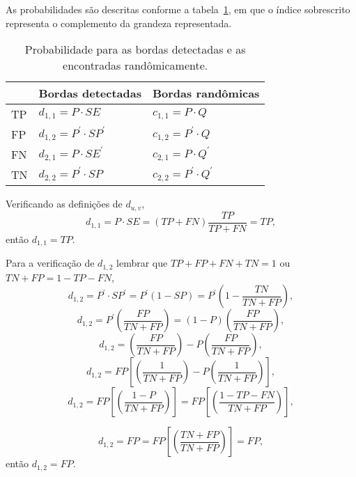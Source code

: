 As probabilidades são descritas  conforme a tabela~\ref{cap_fusao_tab04},
em que o índice sobrescrito representa o complemento da grandeza representada.
 
\begin{table}[hbt]
	\centering
	\caption{Probabilidade para as bordas detectadas e as encontradas randômicamente.}\label{cap_fusao_tab04}
\begin{tabular}{@{}lll@{}} \toprule
	     & Bordas detectadas  & Bordas randômicas  \\ \midrule
	TP  & $d_{1,1}=P    \cdot SE$     & $c_{1,1}=P    \cdot Q$  \\ 
	FP  & $d_{1,2}=P^{'}\cdot SP^{'}$ & $c_{1,2}=P^{'}\cdot Q$  \\ 
	FN  & $d_{2,1}=P    \cdot SE^{'}$ & $c_{2,1}=P    \cdot Q^{'}$  \\ 
	TN  & $d_{2,2}=P^{'}\cdot SP$     & $c_{2,2}=P^{'}\cdot Q^{'}$  \\ \bottomrule 
\end{tabular}
\end{table}


Verificando as definições de $d_{u,v}$,
\begin{equation}\label{cap_fusao_44}
	d_{1,1}=P\cdot SE = (TP + FN)\frac{TP}{TP + FN}=TP,
\end{equation}
então $d_{1,1}= TP$.

Para a verificação de $d_{1,2}$ lembrar que $TP+FP+FN+TN=1$ ou $TN+FP=1-TP-FN$, 
\begin{equation}\nonumber
	d_{1,2}=P^{'}\cdot SP^{'} = P^{'}(1-SP)=P^{'} \left(1-\frac{TN}{TN+FP}\right),
\end{equation}
\begin{equation}\nonumber
	d_{1,2}=P^{'}\left(\frac{FP}{TN+FP}\right)=(1-P)\left(\frac{FP}{TN+FP}\right),
\end{equation}
\begin{equation}\nonumber
	d_{1,2}=\left(\frac{FP}{TN+FP}\right)-P\left(\frac{FP}{TN+FP}\right),
\end{equation}
\begin{equation}\nonumber
	d_{1,2}=FP\left[\left(\frac{1}{TN+FP}\right)-P\left(\frac{1}{TN+FP}\right)\right],
\end{equation}
\begin{equation}\nonumber
	d_{1,2}=FP\left[\left(\frac{1 - P}{TN+FP}\right)\right]=FP\left[\left(\frac{1 - TP - FN}{TN+FP}\right)\right],
\end{equation}
 
\begin{equation}\label{cap_fusao_45}
	d_{1,2}=FP=FP\left[\left(\frac{TN+FP}{TN+FP}\right)\right] = FP,
\end{equation}
então $d_{1,2}= FP$.

